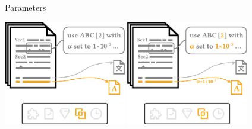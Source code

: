 \documentclass[en,16:9,smallfoot]{sdqbeamer}
\begin{document}
   \begin{frame}{Parameters}
       \begin{overprint}
            \centering\includegraphics[width=0.4\textwidth]{imgs/schema_asp_3_0}
            \centering\includegraphics[width=0.4\textwidth]{imgs/schema_asp_3_1}
       \end{overprint}
   \end{frame}
\end{document}
